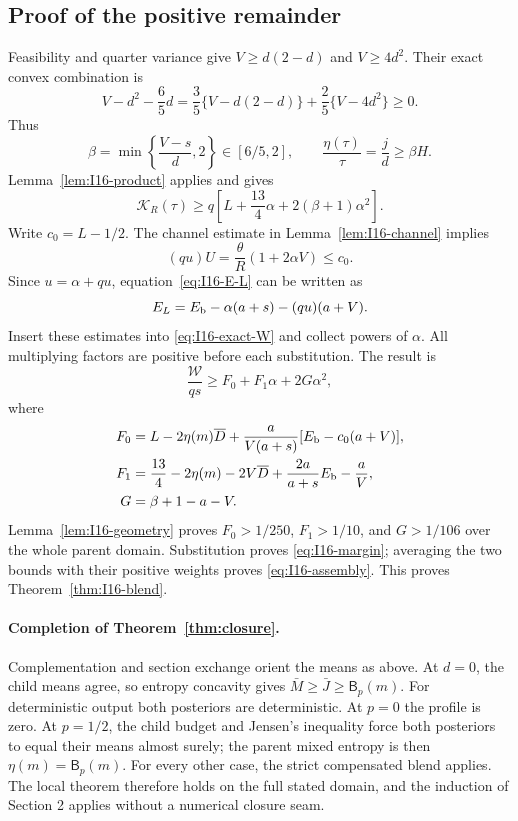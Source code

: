 \documentclass[11pt]{article}
\theoremstyle{remark}\newtheorem{remark}[theorem]{Remark}
\newcommand{\Bprof}{\mathsf B_p}\newcommand{\Pprof}{\Phi_p}
\numberwithin{equation}{section}
\begin{document}
\subsection{Proof of the positive remainder}
Feasibility and quarter variance give $V\ge d(2-d)$ and $V\ge4d^2$.
Their exact convex combination is
\[
 V-d^2-\frac65d
 =\frac35\{V-d(2-d)\}+\frac25\{V-4d^2\}\ge0.
\]
Thus
\begin{equation}\label{eq:I16-beta}
 \beta=\min\left\{\frac{V-s}{d},2\right\}\in[6/5,2],\qquad
 \frac{\eta(\tau)}\tau=\frac jd\ge\beta H.
\end{equation}
Lemma~\ref{lem:I16-product} applies and gives
\[
 \mathcal K_R(\tau)\ge
 q\left[L+\frac{13}{4}\alpha+2(\beta+1)\alpha^2\right].
\]
Write $c_0=L-1/2$. The channel estimate in Lemma~\ref{lem:I16-channel}
implies
\begin{equation}\label{eq:I16-comp-use}
 (qu)U=\frac\theta R(1+2\alpha V)\le c_0.
\end{equation}
Since $u=\alpha+qu$, equation~\eqref{eq:I16-E-L} can be written as
\[
 E_L=E_{\rm b}-\alpha(a+s)-(qu)(a+V).
\]
Insert these estimates into \eqref{eq:I16-exact-W} and collect powers of
$\alpha$. All multiplying factors are positive before each substitution.
The result is
\begin{equation}\label{eq:I16-quadratic}
 \frac{\mathcal W}{q s}\ge F_0+F_1\alpha+2G\alpha^2,
\end{equation}
where
\begin{align}
 F_0&=L-2\eta(m)\overline D+
 \frac a{V(a+s)}[E_{\rm b}-c_0(a+V)],\label{eq:I16-F0}\\
 F_1&=\frac{13}{4}-2\eta(m)-2V\overline D
        +\frac{2a}{a+s}E_{\rm b}-\frac aV,\label{eq:I16-F1}\\
 G&=\beta+1-a-V.\label{eq:I16-G}
\end{align}
Lemma~\ref{lem:I16-geometry} proves $F_0>1/250$, $F_1>1/10$, and
$G>1/106$ over the whole parent domain. Substitution proves
\eqref{eq:I16-margin}; averaging the two bounds with their positive weights
proves \eqref{eq:I16-assembly}. This proves Theorem~\ref{thm:I16-blend}.

\paragraph{Completion of Theorem~\ref{thm:closure}.}
Complementation and section exchange orient the means as above. At $d=0$,
the child means agree, so entropy concavity gives $\bar M\ge\bar J\ge\Bprof(m)$.
For deterministic output both posteriors are deterministic. At $p=0$ the
profile is zero. At $p=1/2$, the child budget and Jensen's inequality force
both posteriors to equal their means almost surely; the parent mixed entropy
is then $\eta(m)=\Bprof(m)$. For every other case, the strict compensated
blend applies. The local theorem therefore holds on the full stated domain,
and the induction of Section 2 applies without a numerical closure seam.
\end{document}
